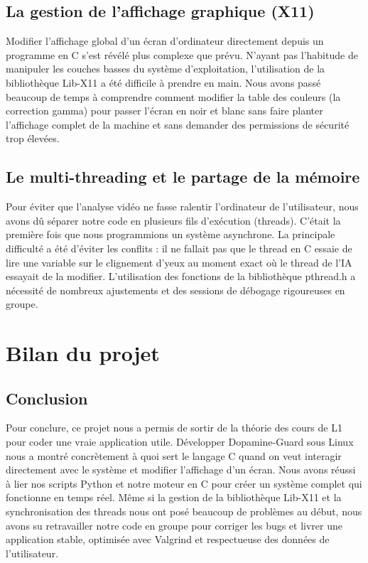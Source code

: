 \documentclass[a4paper, 12pt, twoside]{article}
\begin{document}
\subsection{La gestion de l'affichage graphique (X11)}
Modifier l'affichage global d'un écran d'ordinateur directement depuis un programme en C s'est révélé plus complexe que prévu. N'ayant pas l'habitude de manipuler les couches basses du système d'exploitation, l'utilisation de la bibliothèque Lib-X11 a été difficile à prendre en main. Nous avons passé beaucoup de temps à comprendre comment modifier la table des couleurs (la correction gamma) pour passer l'écran en noir et blanc sans faire planter l'affichage complet de la machine et sans demander des permissions de sécurité trop élevées.

\subsection{Le multi-threading et le partage de la mémoire}
Pour éviter que l'analyse vidéo ne fasse ralentir l'ordinateur de l'utilisateur, nous avons dû séparer notre code en plusieurs fils d'exécution (threads). C'était la première fois que nous programmions un système asynchrone. La principale difficulté a été d'éviter les conflits : il ne fallait pas que le thread en C essaie de lire une variable sur le clignement d'yeux au moment exact où le thread de l'IA essayait de la modifier. L'utilisation des fonctions de la bibliothèque pthread.h a nécessité de nombreux ajustements et des sessions de débogage rigoureuses en groupe.

\newpage

\section{Bilan du projet}

\subsection{Conclusion}
Pour conclure, ce projet nous a permis de sortir de la théorie des cours de L1 pour coder une vraie application utile. Développer Dopamine-Guard sous Linux nous a montré concrètement à quoi sert le langage C quand on veut interagir directement avec le système et modifier l'affichage d'un écran. Nous avons réussi à lier nos scripts Python et notre moteur en C pour créer un système complet qui fonctionne en temps réel. Même si la gestion de la bibliothèque Lib-X11 et la synchronisation des threads nous ont posé beaucoup de problèmes au début, nous avons su retravailler notre code en groupe pour corriger les bugs et livrer une application stable, optimisée avec Valgrind et respectueuse des données de l'utilisateur.
\end{document}

